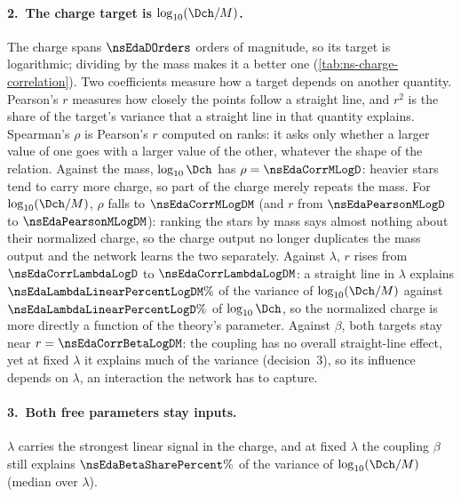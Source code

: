 \FloatBarrier

\paragraph{2.\ The charge target is $\log_{10}(\Dch/M)$.}
The charge spans $\nsEdaDOrders$ orders of magnitude, so its target is logarithmic; dividing by the mass makes it a better one (\cref{tab:ns-charge-correlation}). Two coefficients measure how a target depends on another quantity. Pearson's $r$ measures how closely the points follow a straight line, and $r^2$ is the share of the target's variance that a straight line in that quantity explains. Spearman's $\rho$ is Pearson's $r$ computed on ranks: it asks only whether a larger value of one goes with a larger value of the other, whatever the shape of the relation.
Against the mass, $\log_{10}\Dch$ has $\rho = \nsEdaCorrMLogD$: heavier stars tend to carry more charge, so part of the charge merely repeats the mass. For $\log_{10}(\Dch/M)$, $\rho$ falls to $\nsEdaCorrMLogDM$ (and $r$ from $\nsEdaPearsonMLogD$ to $\nsEdaPearsonMLogDM$): ranking the stars by mass says almost nothing about their normalized charge, so the charge output no longer duplicates the mass output and the network learns the two separately.
Against $\lambda$, $r$ rises from $\nsEdaCorrLambdaLogD$ to $\nsEdaCorrLambdaLogDM$: a straight line in $\lambda$ explains $\nsEdaLambdaLinearPercentLogDM\%$ of the variance of $\log_{10}(\Dch/M)$ against $\nsEdaLambdaLinearPercentLogD\%$ of $\log_{10}\Dch$, so the normalized charge is more directly a function of the theory's parameter.
Against $\beta$, both targets stay near $r = \nsEdaCorrBetaLogDM$: the coupling has no overall straight-line effect, yet at fixed $\lambda$ it explains much of the variance (decision~3), so its influence depends on $\lambda$, an interaction the network has to capture.

\FloatBarrier

\paragraph{3.\ Both free parameters stay inputs.}
$\lambda$ carries the strongest linear signal in the charge, and at fixed $\lambda$ the coupling $\beta$ still explains $\nsEdaBetaSharePercent\%$ of the variance of $\log_{10}(\Dch/M)$ (median over $\lambda$).

